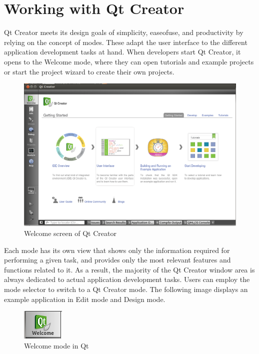 \section{Working with Qt Creator}

Qt  Creator  meets  its  design  goals  of  simplicity,  ease­of­use,  and  productivity  by  relying  on the concept
of  modes.  These  adapt  the   user  interface  to  the  different  application  development  tasks  at  hand.  When
developers  start  Qt  Creator, it opens to  the Welcome mode, where they  can open tutorials and example
projects or start the project wizard to create their own projects.

\begin{figure}[h]
\begin{center}
\includegraphics[scale=0.4]{images/Qt.png}
\caption{Welcome screen of Qt Creator}
\end{center}
\end{figure}

Each  mode  has  its  own  view  that  shows  only  the  information  required  for  performing  a  given  task,   and
provides  only  the  most  relevant  features  and  functions  related  to  it.  As  a  result,  the  majority  of  the  Qt
Creator window area is always dedicated to actual application development tasks.
Users  can  employ  the  mode  selector  to  switch  to  a  Qt  Creator  mode.  The  following  image  displays an
example application in Edit mode and Design mode.

\begin{figure}[h]
\begin{center}
\includegraphics[scale=0.8]{images/welcome.png}
\end{center}
\caption{Welcome mode in Qt}
\end{figure}

